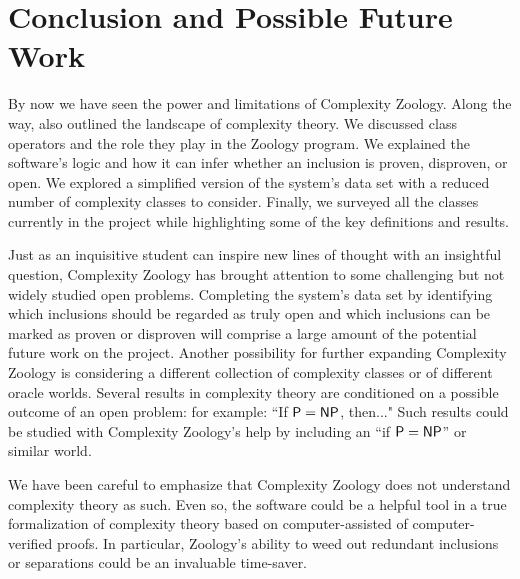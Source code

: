 \section{Conclusion and Possible Future Work}

By now we have seen the power and limitations of Complexity Zoology. Along the way, also outlined the landscape of complexity theory. We discussed class operators and the role they play in the Zoology program. We explained the software's logic and how it can infer whether an inclusion is proven, disproven, or open. We explored a simplified version of the system's data set with a reduced number of complexity classes to consider. Finally, we surveyed all the classes currently in the project while highlighting some of the key definitions and results.

Just as an inquisitive student can inspire new lines of thought with an insightful question, Complexity Zoology has brought attention to some challenging but not widely studied open problems. Completing the system's data set by identifying which inclusions should be regarded as truly open and which inclusions can be marked as proven or disproven will comprise a large amount of the potential future work on the project. Another possibility for further expanding Complexity Zoology is considering a different collection of complexity classes or of different oracle worlds. Several results in complexity theory are conditioned on a possible outcome of an open problem: for example: ``If $\mathsf{P}=\mathsf{NP}$, then..." Such results could be studied with Complexity Zoology's help by including an ``if $\mathsf{P}=\mathsf{NP}$'' or similar world.

We have been careful to emphasize that Complexity Zoology does not understand complexity theory as such. Even so, the software could be a helpful tool in a true formalization of complexity theory based on computer-assisted of computer-verified proofs. In particular, Zoology's ability to weed out redundant inclusions or separations could be an invaluable time-saver.